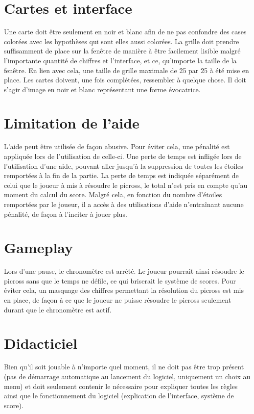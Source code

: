 \documentclass{report}
\begin{document}
	\section{Cartes et interface}
		Une carte doit être seulement en noir et blanc afin de ne pas confondre des cases colorées avec les hypothèses qui sont elles aussi colorées.
		La grille doit prendre suffisamment de place sur la fenêtre de manière à être facilement lisible malgré l'importante quantité de chiffres et l'interface, et ce, qu'importe la taille de la fenêtre. En lien avec cela, une taille de grille maximale de 25 par 25 à été mise en place.
		Les cartes doivent, une fois complétées, ressembler à quelque chose. Il doit s'agir d'image en noir et blanc représentant une forme évocatrice.
	
	\section{Limitation de l'aide}
		L'aide peut être utilisée de façon abusive. Pour éviter cela, une pénalité est appliquée lors de l'utilisation de celle-ci. Une perte de temps est infligée lors de l'utilisation d'une aide, pouvant aller jusqu'à la suppression de toutes les étoiles remportées à la fin de la partie. La perte de temps est indiquée séparément de celui que le joueur à mis à résoudre le picross, le total n'est pris en compte qu'au moment du calcul du score. Malgré cela, en fonction du nombre d'étoiles remportées par le joueur, il a accès à des utilisations d'aide n'entraînant aucune pénalité, de façon à l'inciter à jouer plus.
	
	\section{Gameplay}
		Lors d'une pause, le chronomètre est arrêté. Le joueur pourrait ainsi résoudre le picross sans que le temps ne défile, ce qui briserait le système de scores. Pour éviter cela, un masquage des chiffres permettant la résolution du picross est mis en place, de façon à ce que le joueur ne puisse résoudre le picross seulement durant que le chronomètre est actif.
		
	\section{Didacticiel}
		Bien qu'il soit jouable à n'importe quel moment, il ne doit pas être trop présent (pas de démarrage automatique au lancement du logiciel, uniquement un choix au menu) et doit seulement contenir le nécessaire pour expliquer toutes les règles ainsi que le fonctionnement du logiciel (explication de l'interface, système de score).
	
\end{document}
